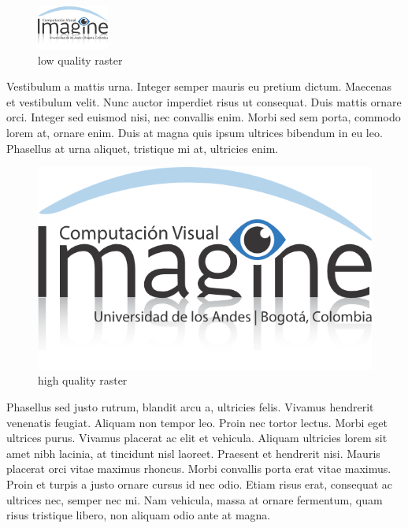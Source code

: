\documentclass[10pt,twocolumn,letterpaper]{article}
\begin{document}
\begin{figure}[t]
\begin{center}
   \includegraphics[width=0.8\linewidth]{imagine_low.png}
\end{center}
   \caption{low quality raster}
\label{fig:long}
\label{fig:onecol}
\end{figure}


Vestibulum a mattis urna. Integer semper mauris eu pretium dictum. Maecenas et vestibulum velit. Nunc auctor imperdiet risus ut consequat. Duis mattis ornare orci. Integer sed euismod nisi, nec convallis enim. Morbi sed sem porta, commodo lorem at, ornare enim. Duis at magna quis ipsum ultrices bibendum in eu leo. Phasellus at urna aliquet, tristique mi at, ultricies enim.

\begin{figure}[t]
\begin{center}
\includegraphics[width=0.8\linewidth]{imagine_high.png}
\end{center}
   \caption{high quality raster}
\label{fig:long}
\label{fig:onecol}
\end{figure}


Phasellus sed justo rutrum, blandit arcu a, ultricies felis. Vivamus hendrerit venenatis feugiat. Aliquam non tempor leo. Proin nec tortor lectus. Morbi eget ultrices purus. Vivamus placerat ac elit et vehicula. Aliquam ultricies lorem sit amet nibh lacinia, at tincidunt nisl laoreet. Praesent et hendrerit nisi. Mauris placerat orci vitae maximus rhoncus. Morbi convallis porta erat vitae maximus. Proin et turpis a justo ornare cursus id nec odio. Etiam risus erat, consequat ac ultrices nec, semper nec mi. Nam vehicula, massa at ornare fermentum, quam risus tristique libero, non aliquam odio ante at magna.
\end{document}
